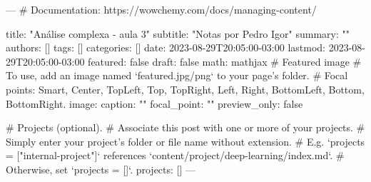 ---
# Documentation: https://wowchemy.com/docs/managing-content/

title: "Análise complexa - aula 3"
subtitle: "Notas por Pedro Igor"
summary: ""
authors: []
tags: []
categories: []
date: 2023-08-29T20:05:00-03:00
lastmod: 2023-08-29T20:05:00-03:00
featured: false
draft: false
math: mathjax
# Featured image
# To use, add an image named `featured.jpg/png` to your page's folder.
# Focal points: Smart, Center, TopLeft, Top, TopRight, Left, Right, BottomLeft, Bottom, BottomRight.
image:
  caption: ""
  focal_point: ""
  preview_only: false

# Projects (optional).
#   Associate this post with one or more of your projects.
#   Simply enter your project's folder or file name without extension.
#   E.g. `projects = ["internal-project"]` references `content/project/deep-learning/index.md`.
#   Otherwise, set `projects = []`.
projects: []
---


